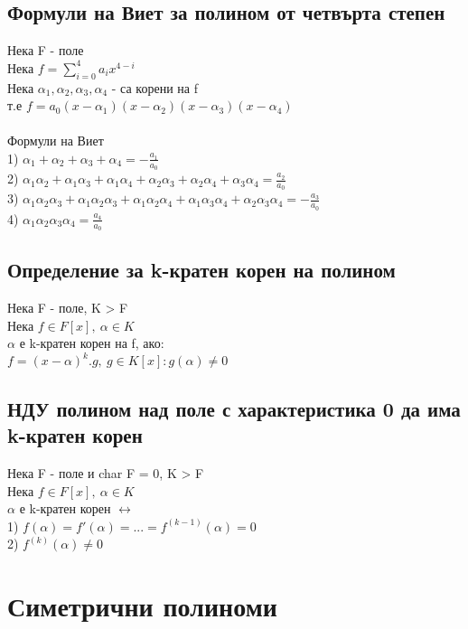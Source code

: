 \documentclass[12pt]{article}
\begin{document}
\subsection{Формули на Виет за полином от четвърта степен}
Нека F - поле \\
Нека $f = \sum\limits_{i=0}^{4}a_ix^{4-i}$ \\
Нека $\alpha_1 , \alpha_2 , \alpha_3 , \alpha_4$ - са корени на f \\
т.е $f = a_0(x-\alpha_1)(x-\alpha_2)(x-\alpha_3)(x-\alpha_4)$ \\\\
Формули на Виет\\
1) $\alpha_1 + \alpha_2 + \alpha_3 + \alpha_4 = -\frac{a_1}{a_0}$ \\
2) $\alpha_1\alpha_2 + \alpha_1\alpha_3 + \alpha_1\alpha_4 + \alpha_2\alpha_3 + \alpha_2\alpha_4 + \alpha_3\alpha_4 = \frac{a_2}{a_0}$\\
3) $\alpha_1\alpha_2\alpha_3 + \alpha_1\alpha_2\alpha_3 + \alpha_1\alpha_2\alpha_4 + \alpha_1\alpha_3\alpha_4 + \alpha_2\alpha_3\alpha_4 = -\frac{a_3}{a_0}$\\
4) $\alpha_1\alpha_2\alpha_3\alpha_4 = \frac{a_4}{a_0}$

\subsection{Определение за k-кратен корен на полином}
Нека F - поле, K > F \\
Нека $f \in F[x],\ \alpha \in K$  \\
$\alpha$ е k-кратен корен на f, ако:\\
$f = (x-\alpha)^k.g, \ g \in K[x] : g(\alpha) \neq 0$

\subsection{НДУ полином над поле с характеристика 0 да има k-кратен корен}
Нека F - поле и char F = 0, K > F \\
Нека $f \in F[x],\ \alpha \in K$\\
$\alpha$ е k-кратен корен $\leftrightarrow $\\
1) $f(\alpha) = f'(\alpha)=...=f^{(k-1)}(\alpha) = 0$ \\
2) $f^{(k)}(\alpha) \neq 0$

\section{Симетрични полиноми}
\end{document}
